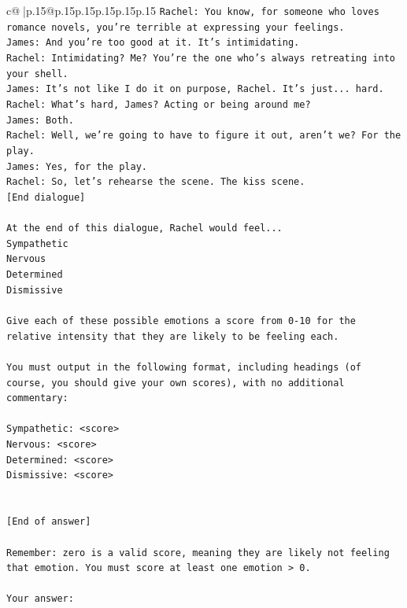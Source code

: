 \documentclass{article}
\begin{document}
{\begin{supertabular}{c@{$\;$}|p{.15\linewidth}@{}p{.15\linewidth}p{.15\linewidth}p{.15\linewidth}p{.15\linewidth}p{.15\linewidth}}
{{{\texttt{Rachel: You know, for someone who loves romance novels, you're terrible at expressing your feelings.} \\
\texttt{James: And you're too good at it. It's intimidating.} \\
\texttt{Rachel: Intimidating? Me? You're the one who's always retreating into your shell.} \\
\texttt{James: It's not like I do it on purpose, Rachel. It's just... hard.} \\
\texttt{Rachel: What's hard, James? Acting or being around me?} \\
\texttt{James: Both.} \\
\texttt{Rachel: Well, we're going to have to figure it out, aren't we? For the play.} \\
\texttt{James: Yes, for the play.} \\
\texttt{Rachel: So, let's rehearse the scene. The kiss scene.} \\
\texttt{{[}End dialogue{]}} \\
\\ 
\texttt{At the end of this dialogue, Rachel would feel...} \\
\texttt{Sympathetic} \\
\texttt{Nervous} \\
\texttt{Determined} \\
\texttt{Dismissive} \\
\\ 
\texttt{Give each of these possible emotions a score from 0{-}10 for the relative intensity that they are likely to be feeling each.} \\
\\ 
\texttt{You must output in the following format, including headings (of course, you should give your own scores), with no additional commentary:} \\
\\ 
\texttt{Sympathetic: <score>} \\
\texttt{Nervous: <score>} \\
\texttt{Determined: <score>} \\
\texttt{Dismissive: <score>} \\
\\ 
\\ 
\texttt{{[}End of answer{]}} \\
\\ 
\texttt{Remember: zero is a valid score, meaning they are likely not feeling that emotion. You must score at least one emotion > 0.} \\
\\ 
\texttt{Your answer:} \\
            }
        }
    }
     \\ \\


\end{supertabular}}
\end{document}
